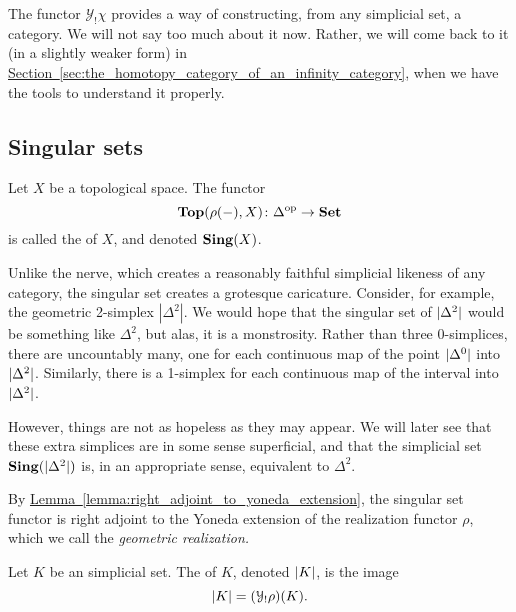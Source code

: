 \documentclass[main.tex]{subfiles}
\begin{document}
The functor $\mathcal{Y}_{!}\chi$ provides a way of constructing, from any simplicial set, a category. We will not say too much about it now. Rather, we will come back to it (in a slightly weaker form) in \hyperref[sec:the_homotopy_category_of_an_infinity_category]{Section~\ref*{sec:the_homotopy_category_of_an_infinity_category}}, when we have the tools to understand it properly.

\subsection{Singular sets}
\label{ssc:singular_sets}

\begin{definition}
  \label{def:singular_set_of_a_topological_space}
  Let $X$ be a topological space. The functor
  \begin{equation*}
    \mathbf{Top}(\rho(-), X)\colon \Delta^{\mathrm{op}} \to \mathbf{Set}
  \end{equation*}
  is called the  of $X$, and denoted $\mathbf{Sing}(X)$.
\end{definition}

Unlike the nerve, which creates a reasonably faithful simplicial likeness of any category, the singular set creates a grotesque caricature. Consider, for example, the geometric 2-simplex $|\Delta^{2}|$. We would hope that the singular set of ${| \Delta^{2} |}$ would be something like $\Delta^{2}$, but alas, it is a monstrosity. Rather than three 0-simplices, there are uncountably many, one for each continuous map of the point ${| \Delta^{0} |}$ into ${| \Delta^{2} |}$. Similarly, there is a 1-simplex for each continuous map of the interval into ${| \Delta^{2} |}$.

However, things are not as hopeless as they may appear. We will later see that these extra simplices are in some sense superficial, and that the simplicial set $\mathbf{Sing}({| \Delta^{2} |})$ is, in an appropriate sense, equivalent to $\Delta^{2}$.

By \hyperref[lemma:right_adjoint_to_yoneda_extension]{Lemma~\ref*{lemma:right_adjoint_to_yoneda_extension}}, the singular set functor is right adjoint to the Yoneda extension of the realization functor $\rho$, which we call the \emph{geometric realization.}

\begin{definition}
  \label{def:geometric_realization}
  Let $K$ be an simplicial set. The  of $K$, denoted ${| K |}$, is the image
  \begin{equation*}
    {| K |} = (\mathcal{Y}_{!}\rho)(K).
  \end{equation*}
\end{definition}
\end{document}
